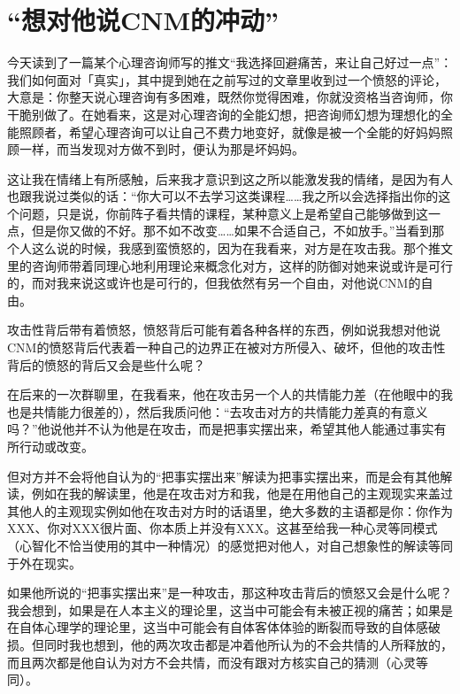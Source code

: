 \chapter{“想对他说CNM的冲动”}





今天读到了一篇某个心理咨询师写的推文“我选择回避痛苦，来让自己好过一点”：我们如何面对「真实」，其中提到她在之前写过的文章里收到过一个愤怒的评论，大意是：你整天说心理咨询有多困难，既然你觉得困难，你就没资格当咨询师，你干脆别做了。在她看来，这是对心理咨询的全能幻想，把咨询师幻想为理想化的全能照顾者，希望心理咨询可以让自己不费力地变好，就像是被一个全能的好妈妈照顾一样，而当发现对方做不到时，便认为那是坏妈妈。

这让我在情绪上有所感触，后来我才意识到这之所以能激发我的情绪，是因为有人也跟我说过类似的话：“你大可以不去学习这类课程……我之所以会选择指出你的这个问题，只是说，你前阵子看共情的课程，某种意义上是希望自己能够做到这一点，但是你又做的不好。那不如不改变……如果不合适自己，不如放手。”当看到那个人这么说的时候，我感到蛮愤怒的，因为在我看来，对方是在攻击我。那个推文里的咨询师带着同理心地利用理论来概念化对方，这样的防御对她来说或许是可行的，而对我来说这或许也是可行的，但我依然有另一个自由，对他说CNM的自由。

攻击性背后带有着愤怒，愤怒背后可能有着各种各样的东西，例如说我想对他说CNM的愤怒背后代表着一种自己的边界正在被对方所侵入、破坏，但他的攻击性背后的愤怒的背后又会是些什么呢？

在后来的一次群聊里，在我看来，他在攻击另一个人的共情能力差（在他眼中的我也是共情能力很差的），然后我质问他：“去攻击对方的共情能力差真的有意义吗？”他说他并不认为他是在攻击，而是把事实摆出来，希望其他人能通过事实有所行动或改变。

但对方并不会将他自认为的“把事实摆出来”解读为把事实摆出来，而是会有其他解读，例如在我的解读里，他是在攻击对方和我，他是在用他自己的主观现实来盖过其他人的主观现实\pozhehao{}例如他在攻击对方时的话语里，绝大多数的主语都是你：你作为XXX、你对XXX很片面、你本质上并没有XXX。这甚至给我一种心灵等同模式（心智化不恰当使用的其中一种情况）的感觉\pozhehao{}把对他人，对自己想象性的解读等同于外在现实。

如果他所说的“把事实摆出来”是一种攻击，那这种攻击背后的愤怒又会是什么呢？我会想到，如果是在人本主义的理论里，这当中可能会有未被正视的痛苦；如果是在自体心理学的理论里，这当中可能会有自体客体体验的断裂而导致的自体感破损。但同时我也想到，他的两次攻击都是冲着他所认为的不会共情的人所释放的，而且两次都是他自认为对方不会共情，而没有跟对方核实自己的猜测（心灵等同）。

